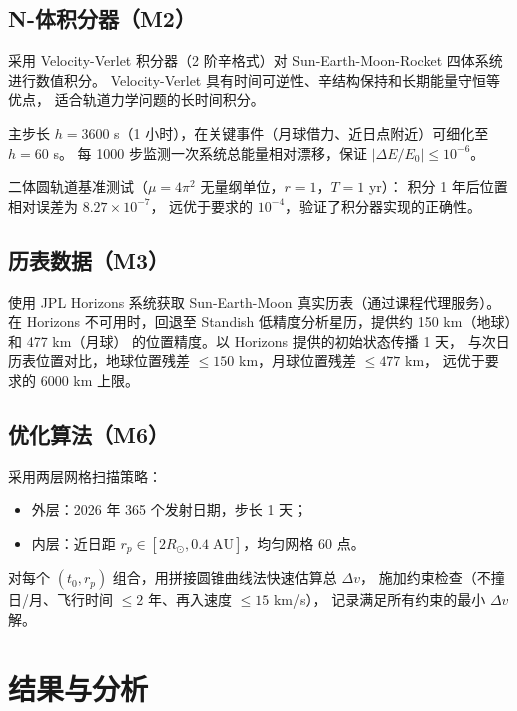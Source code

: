 \documentclass[12pt,a4paper]{ctexart}
\begin{document}
\subsection{N-体积分器（M2）}

采用 Velocity-Verlet 积分器（2 阶辛格式）对 Sun-Earth-Moon-Rocket 四体系统进行数值积分。
Velocity-Verlet 具有时间可逆性、辛结构保持和长期能量守恒等优点，
适合轨道力学问题的长时间积分。

主步长 $h = 3600$ s（1 小时），在关键事件（月球借力、近日点附近）可细化至 $h = 60$ s。
每 1000 步监测一次系统总能量相对漂移，保证 $\left|\Delta E / E_0\right| \leq 10^{-6}$。

二体圆轨道基准测试（$\mu = 4\pi^2$ 无量纲单位，$r=1$，$T=1$ yr）：
积分 1 年后位置相对误差为 $8.27 \times 10^{-7}$，
远优于要求的 $10^{-4}$，验证了积分器实现的正确性。

\subsection{历表数据（M3）}

使用 JPL Horizons 系统获取 Sun-Earth-Moon 真实历表（通过课程代理服务）。
在 Horizons 不可用时，回退至 Standish 低精度分析星历，提供约 150 km（地球）和 477 km（月球）
的位置精度。以 Horizons 提供的初始状态传播 1 天，
与次日历表位置对比，地球位置残差 $\leq 150$ km，月球位置残差 $\leq 477$ km，
远优于要求的 6000 km 上限。

\subsection{优化算法（M6）}

采用两层网格扫描策略：
\begin{itemize}
\item 外层：2026 年 365 个发射日期，步长 1 天；
\item 内层：近日距 $r_p \in [2R_\odot, 0.4\;\text{AU}]$，均匀网格 60 点。
\end{itemize}

对每个 $(t_0, r_p)$ 组合，用拼接圆锥曲线法快速估算总 $\Delta v$，
施加约束检查（不撞日/月、飞行时间 $\leq 2$ 年、再入速度 $\leq 15$ km/s），
记录满足所有约束的最小 $\Delta v$ 解。

\section{结果与分析}
\end{document}
